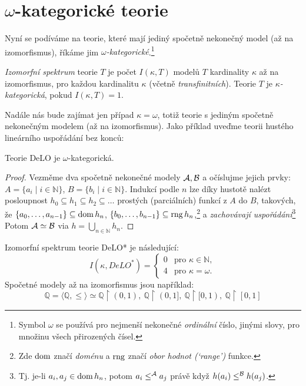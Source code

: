 \section{$\omega$-kategorické teorie}\label{section:categoricity}

Nyní se podíváme na teorie, které mají jediný spočetně nekonečný model (až na izomorfismus), říkáme jim \emph{$\omega$-kategorické}.\footnote{Symbol $\omega$ se používá pro nejmenší nekonečné \emph{ordinální} číslo, jinými slovy, pro množinu všech přirozených čísel.}

\begin{definition}
    \emph{Izomorfní spektrum} teorie $T$ je počet $
    I(\kappa,T)$ modelů $T$ kardinality $\kappa$ až na izomorfismus, pro každou kardinalitu $\kappa$ (včetně \emph{transfinitních}).     Teorie $T$ je \emph{$\kappa$-kategorická}, pokud $
    I(\kappa,T)=1$.
\end{definition}

Nadále nás bude zajímat jen případ $\kappa=\omega$, totiž teorie s jediným spočetně nekonečným modelem (až na izomorfismus). Jako příklad uveďme teorii hustého lineárního uspořádání bez konců:

\begin{proposition}
    Teorie DeLO je $\omega$-kategorická.
\end{proposition}
\begin{proof}
Vezměme dva spočetně nekonečné modely $\mathcal{A},\mathcal{B}$ a očíslujme jejich prvky: $A=\{a_i\mid i\in\mathbb N\}$, $B=\{b_i\mid i\in\mathbb N\}$. Indukcí podle $n$ lze díky hustotě nalézt posloupnost $h_0\subseteq h_1\subseteq h_2\subseteq\dots$ prostých (parciálních) funkcí z $A$ do $B$, takových, že $\{a_0,\dots,a_{n-1}\}\subseteq\operatorname{dom} h_n$, $\{b_0,\dots,b_{n-1}\}\subseteq\operatorname{rng} h_n$,\footnote{Zde $\operatorname{dom}$ značí \emph{doménu} a $\operatorname{rng}$ značí \emph{obor hodnot (`range')} funkce.} a \emph{zachovávají uspořádání}\footnote{Tj. je-li $a_i,a_j\in\operatorname{dom} h_n$, potom $a_i\leq^{\mathcal{A}} a_j$ právě když $h(a_i)\leq^{\mathcal{B}} h(a_j)$.} Potom $\mathcal{A}\simeq\mathcal{B}$ via $h=\bigcup_{n\in\mathbb N}h_n$.
\end{proof}

\begin{corollary}
Izomorfní spektrum teorie DeLO* je následující:
$$
I(\kappa,DeLO^*)=\begin{cases}
    0 &\text{pro }\kappa\in\mathbb{N},\\
    4 &\text{pro }\kappa=\omega.
\end{cases}
$$
Spočetné modely až na izomorfismus jsou například:
$$
\mathbb Q=\langle \mathbb Q,\leq\rangle\simeq\mathbb Q\upharpoonright(0,1), \ \mathbb Q\upharpoonright(0,1], \ \mathbb Q \upharpoonright [0,1), \ \mathbb Q \upharpoonright [0,1]
$$
\end{corollary}

